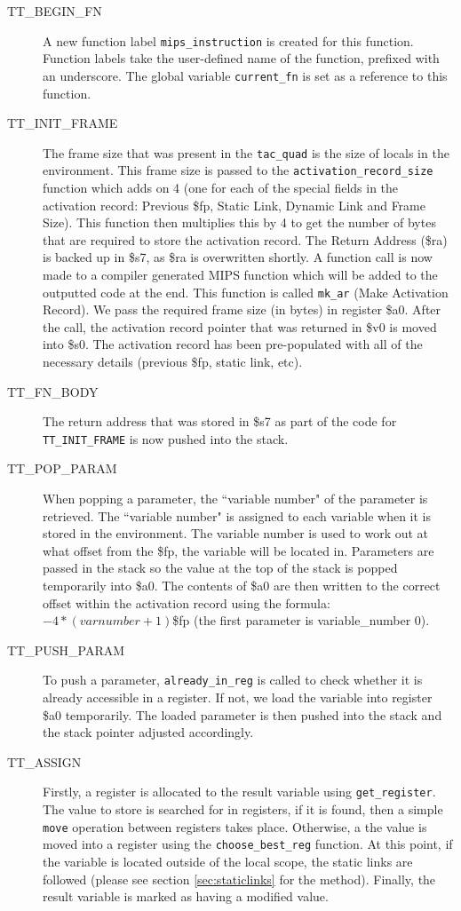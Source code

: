 \begin{description}
	\item[TT\_BEGIN\_FN] A new function label \verb!mips_instruction! is created for this function. Function labels take the user-defined name of the function, prefixed with an underscore. The global variable \verb!current_fn! is set as a reference to this function.
	\item[TT\_INIT\_FRAME] The frame size that was present in the \verb!tac_quad! is the size of locals in the environment. This frame size is passed to the \verb!activation_record_size! function which adds on 4 (one for each of the special fields in the activation record: Previous \$fp, Static Link, Dynamic Link and Frame Size). This function then multiplies this by 4 to get the number of bytes that are required to store the activation record. The Return Address (\$ra) is backed up in \$s7, as \$ra is overwritten shortly. A function call is now made to a compiler generated MIPS function which will be added to the outputted code at the end. This function is called \verb!mk_ar! (Make Activation Record). We pass the required frame size (in bytes) in register \$a0. After the call, the activation record pointer that was returned in \$v0 is moved into \$s0. The activation record has been pre-populated with all of the necessary details (previous \$fp, static link, etc).
	\item[TT\_FN\_BODY] The return address that was stored in \$s7 as part of the code for \verb!TT_INIT_FRAME! is now pushed into the stack.
	\item[TT\_POP\_PARAM] When popping a parameter, the ``variable number" of the parameter is retrieved. The ``variable number" is assigned to each variable when it is stored in the environment. The variable number is used to work out at what offset from the \$fp, the variable will be located in. Parameters are passed in the stack so the value at the top of the stack is popped temporarily into \$a0. The contents of \$a0 are then written to the correct offset within the activation record using the formula: $-4 * (varnumber + 1)$\$fp (the first parameter is variable\_number 0).
	\item[TT\_PUSH\_PARAM] To push a parameter, \verb!already_in_reg! is called to check whether it is already accessible in a register. If not, we load the variable into register \$a0 temporarily. The loaded parameter is then pushed into the stack and the stack pointer adjusted accordingly.
	\item[TT\_ASSIGN] Firstly, a register is allocated to the result variable using \verb!get_register!. The value to store is searched for in registers, if it is found, then a simple \verb!move! operation between registers takes place. Otherwise, a the value is moved into a register using the \verb!choose_best_reg! function. At this point, if the variable is located outside of the local scope, the static links are followed (please see section \ref{sec:staticlinks} for the method). Finally, the result variable is marked as having a modified value.

\end{description}
